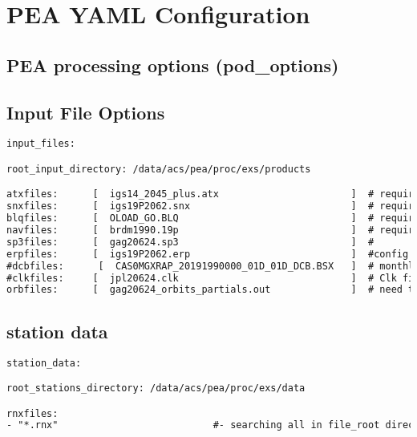 \chapter{PEA YAML Configuration}
\label{ch:pea_yaml_configuration}
\section{PEA processing options (pod\_options)}
%
%
\section{Input File Options}
\begin{lstlisting}[language=xml,caption=yaml input files configuration example]
input_files:

root_input_directory: /data/acs/pea/proc/exs/products

atxfiles:      [  igs14_2045_plus.atx                       ]  # required
snxfiles:      [  igs19P2062.snx                            ]  # required
blqfiles:      [  OLOAD_GO.BLQ                              ]  # required if ocean loading is applied
navfiles:      [  brdm1990.19p                              ]  # required but shouldn't!
sp3files:      [  gag20624.sp3                              ]  #
erpfiles:      [  igs19P2062.erp                            ]  #config parser doesn't accept weekly files yet.
#dcbfiles:      [  CAS0MGXRAP_20191990000_01D_01D_DCB.BSX   ]  # monthly DCB file
#clkfiles:     [  jpl20624.clk                              ]  # Clk file
orbfiles:      [  gag20624_orbits_partials.out              ]  # need this when estimating orbits (overrides .sp3 file)
\end{lstlisting}

\section{station data}
\begin{lstlisting}[language=xml,caption=yaml input files configuration example]
station_data:

root_stations_directory: /data/acs/pea/proc/exs/data

rnxfiles:
- "*.rnx"                           #- searching all in file_root directory
\end{lstlisting}

